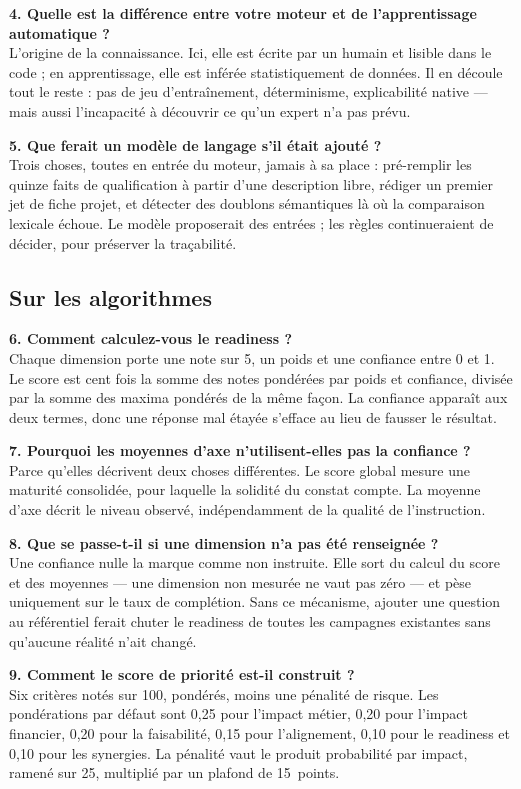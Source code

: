 \textbf{4. Quelle est la différence entre votre moteur et de l'apprentissage
automatique ?}\\
L'origine de la connaissance. Ici, elle est écrite par un humain et lisible dans le
code ; en apprentissage, elle est inférée statistiquement de données. Il en découle tout
le reste : pas de jeu d'entraînement, déterminisme, explicabilité native — mais aussi
l'incapacité à découvrir ce qu'un expert n'a pas prévu.

\textbf{5. Que ferait un modèle de langage s'il était ajouté ?}\\
Trois choses, toutes en entrée du moteur, jamais à sa place : pré-remplir les quinze
faits de qualification à partir d'une description libre, rédiger un premier jet de fiche
projet, et détecter des doublons sémantiques là où la comparaison lexicale échoue. Le
modèle proposerait des entrées ; les règles continueraient de décider, pour préserver la
traçabilité.

\subsection*{Sur les algorithmes}

\textbf{6. Comment calculez-vous le readiness ?}\\
Chaque dimension porte une note sur 5, un poids et une confiance entre 0 et 1. Le score
est cent fois la somme des notes pondérées par poids et confiance, divisée par la somme
des maxima pondérés de la même façon. La confiance apparaît aux deux termes, donc une
réponse mal étayée s'efface au lieu de fausser le résultat.

\textbf{7. Pourquoi les moyennes d'axe n'utilisent-elles pas la confiance ?}\\
Parce qu'elles décrivent deux choses différentes. Le score global mesure une maturité
consolidée, pour laquelle la solidité du constat compte. La moyenne d'axe décrit le
niveau observé, indépendamment de la qualité de l'instruction.

\textbf{8. Que se passe-t-il si une dimension n'a pas été renseignée ?}\\
Une confiance nulle la marque comme non instruite. Elle sort du calcul du score et des
moyennes — une dimension non mesurée ne vaut pas zéro — et pèse uniquement sur le taux
de complétion. Sans ce mécanisme, ajouter une question au référentiel ferait chuter le
readiness de toutes les campagnes existantes sans qu'aucune réalité n'ait changé.

\textbf{9. Comment le score de priorité est-il construit ?}\\
Six critères notés sur 100, pondérés, moins une pénalité de risque. Les pondérations par
défaut sont 0,25 pour l'impact métier, 0,20 pour l'impact financier, 0,20 pour la
faisabilité, 0,15 pour l'alignement, 0,10 pour le readiness et 0,10 pour les synergies.
La pénalité vaut le produit probabilité par impact, ramené sur 25, multiplié par un
plafond de 15~points.

